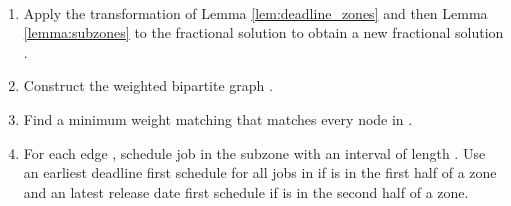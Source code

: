 \begin{alg}\label{alg:singleproc}
~
\begin{enumerate}
\item Apply the transformation of Lemma \ref{lem:deadline_zones} and then Lemma \ref{lemma:subzones} to the fractional solution to obtain a new fractional solution .
\item Construct the weighted bipartite graph .
\item Find a minimum weight matching  that matches every node in .
\item For each edge , schedule job  in the subzone  with an interval of length . Use an earliest deadline first schedule for all jobs in  if  is in the first half of a zone and an latest release date first schedule if  is in the second half of a zone.
\end{enumerate}

\end{alg}
